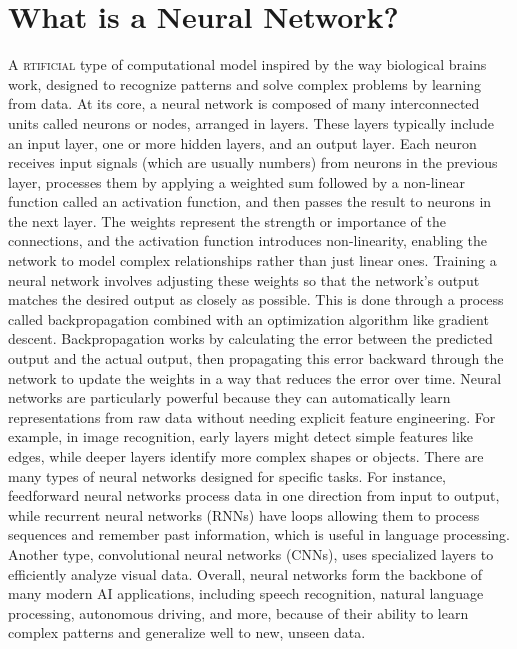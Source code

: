 \documentclass{book}
\begin{document}
\section{What is a Neural Network?}
\lettrine{A}{ rtificial} type of computational model inspired by the way biological brains work, designed to recognize patterns and solve complex problems by learning from data. At its core, a neural network is composed of many interconnected units called neurons or nodes, arranged in layers. These layers typically include an input layer, one or more hidden layers, and an output layer.
Each neuron receives input signals (which are usually numbers) from neurons in the previous layer, processes them by applying a weighted sum followed by a non-linear function called an activation function, and then passes the result to neurons in the next layer. The weights represent the strength or importance of the connections, and the activation function introduces non-linearity, enabling the network to model complex relationships rather than just linear ones.
Training a neural network involves adjusting these weights so that the network’s output matches the desired output as closely as possible. This is done through a process called backpropagation combined with an optimization algorithm like gradient descent. Backpropagation works by calculating the error between the predicted output and the actual output, then propagating this error backward through the network to update the weights in a way that reduces the error over time.
Neural networks are particularly powerful because they can automatically learn representations from raw data without needing explicit feature engineering. For example, in image recognition, early layers might detect simple features like edges, while deeper layers identify more complex shapes or objects.
There are many types of neural networks designed for specific tasks. For instance, feedforward neural networks process data in one direction from input to output, while recurrent neural networks (RNNs) have loops allowing them to process sequences and remember past information, which is useful in language processing. Another type, convolutional neural networks (CNNs), uses specialized layers to efficiently analyze visual data.
Overall, neural networks form the backbone of many modern AI applications, including speech recognition, natural language processing, autonomous driving, and more, because of their ability to learn complex patterns and generalize well to new, unseen data.
\end{document}
